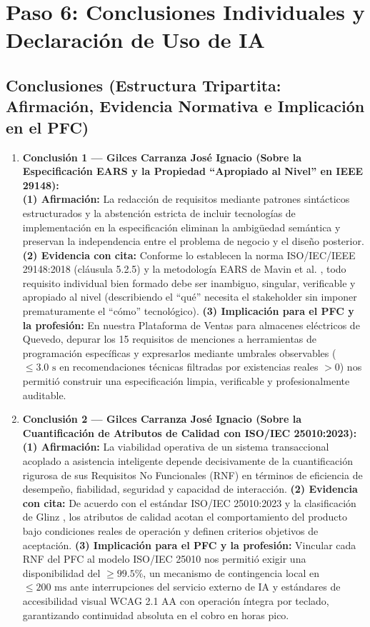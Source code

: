 \section{Paso 6: Conclusiones Individuales y Declaración de Uso de IA}
\subsection{Conclusiones (Estructura Tripartita: Afirmación, Evidencia Normativa e Implicación en el PFC)}
\begin{enumerate}
	\item \textbf{Conclusión 1 --- Gilces Carranza José Ignacio (Sobre la Especificación EARS y la Propiedad ``Apropiado al Nivel'' en IEEE 29148):} \\
	\textbf{(1) Afirmación:} La redacción de requisitos mediante patrones sintácticos estructurados y la abstención estricta de incluir tecnologías de implementación en la especificación eliminan la ambigüedad semántica y preservan la independencia entre el problema de negocio y el diseño posterior. \textbf{(2) Evidencia con cita:} Conforme lo establecen la norma ISO/IEC/IEEE 29148:2018 (cláusula 5.2.5) \cite{ieee29148} y la metodología EARS de Mavin et al. \cite{mavin2009ears}, todo requisito individual bien formado debe ser inambiguo, singular, verificable y apropiado al nivel (describiendo el ``qué'' necesita el stakeholder sin imponer prematuramente el ``cómo'' tecnológico). \textbf{(3) Implicación para el PFC y la profesión:} En nuestra Plataforma de Ventas para almacenes eléctricos de Quevedo, depurar los 15 requisitos de menciones a herramientas de programación específicas y expresarlos mediante umbrales observables ($\le 3.0\text{ s}$ en recomendaciones técnicas filtradas por existencias reales $>0$) nos permitió construir una especificación limpia, verificable y profesionalmente auditable.
	
	\item \textbf{Conclusión 2 --- Gilces Carranza José Ignacio (Sobre la Cuantificación de Atributos de Calidad con ISO/IEC 25010:2023):} \\
	\textbf{(1) Afirmación:} La viabilidad operativa de un sistema transaccional acoplado a asistencia inteligente depende decisivamente de la cuantificación rigurosa de sus Requisitos No Funcionales (RNF) en términos de eficiencia de desempeño, fiabilidad, seguridad y capacidad de interacción. \textbf{(2) Evidencia con cita:} De acuerdo con el estándar ISO/IEC 25010:2023 \cite{iso25010} y la clasificación de Glinz \cite{glinz2007nfr}, los atributos de calidad acotan el comportamiento del producto bajo condiciones reales de operación y definen criterios objetivos de aceptación. \textbf{(3) Implicación para el PFC y la profesión:} Vincular cada RNF del PFC al modelo ISO/IEC 25010 nos permitió exigir una disponibilidad del $\ge 99.5\%$, un mecanismo de contingencia local en $\le 200\text{ ms}$ ante interrupciones del servicio externo de IA y estándares de accesibilidad visual WCAG 2.1 AA con operación íntegra por teclado, garantizando continuidad absoluta en el cobro en horas pico.
	

\end{enumerate}
